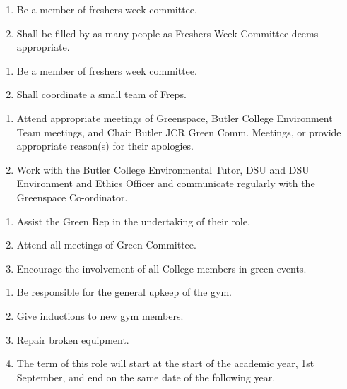 \begin{enumerate}
    \item Be a member of freshers week committee.
    \item Shall be filled by as many people as Freshers Week Committee deems appropriate.
\end{enumerate}

\begin{enumerate}
    \item Be a member of freshers week committee.
    \item Shall coordinate a small team of Freps.
\end{enumerate}

\begin{enumerate}
    \item Attend appropriate meetings of Greenspace, Butler College Environment Team meetings, and Chair Butler JCR Green Comm. Meetings, or provide appropriate reason(s) for their apologies.
    \item Work with the Butler College Environmental Tutor, DSU and DSU Environment and Ethics Officer and communicate regularly with the Greenspace Co-ordinator.
    
\end{enumerate}

\begin{enumerate}
    \item Assist the Green Rep in the undertaking of their role.
    \item Attend all meetings of Green Committee.
    \item Encourage the involvement of all College members in green events.
\end{enumerate}

\begin{enumerate}
    \item Be responsible for the general upkeep of the gym.
    \item Give inductions to new gym members. 
    \item Repair broken equipment.
    \item The term of this role will start at the start of the academic year, 1st September, and end on the same date of the following year.
    
\end{enumerate}

